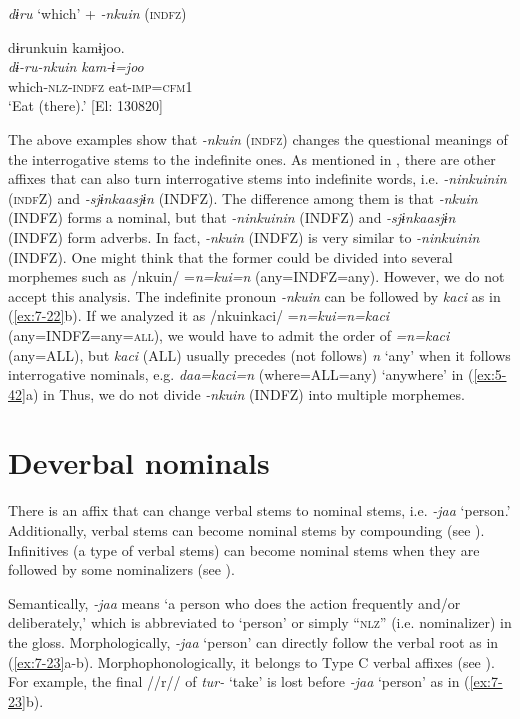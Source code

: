 \ex \label{ex:7:22e} \textit{dɨru} ‘which’ + \textit{{}-nkuin} (\textsc{indfz})

{\TM}
\glll  dɨrunkuin  kamɨjoo.\\
\textit{dɨ-ru-nkuin}  \textit{kam-ɨ=joo}\\
which-\textsc{nlz}-\textsc{indfz}  eat-\textsc{imp}=\textsc{cfm}1\\
\glt ‘Eat  (there).’ [El: 130820]

\z
\z

The above examples show that \textit{{}-nkuin} (\textsc{indfz}) changes the questional meanings of the interrogative stems to the indefinite ones. As mentioned in , there are other affixes that can also turn interrogative stems into indefinite words, i.e. \textit{{}-ninkuinin} (\textsc{indf}Z) and \textit{{}-sjɨnkaasjɨn} (INDFZ). The difference among them is that \textit{{}-nkuin} (INDFZ) forms a nominal, but that \textit{{}-ninkuinin} (INDFZ) and \textit{{}-sjɨnkaasjɨn} (INDFZ) form adverbs. In fact, \textit{{}-nkuin} (INDFZ) is very similar to \textit{{}-ninkuinin} (INDFZ). One might think that the former could be divided into several morphemes such as /nkuin/ =\textit{n=kui=n} (any=INDFZ=any). However, we do not accept this analysis. The indefinite pronoun \textit{{}-nkuin} can be followed by \textit{kaci} as in (\ref{ex:7-22}b). If we analyzed it as /nkuinkaci/ =\textit{n=kui=n=kaci} (any=INDFZ=any=\textsc{all}), we would have to admit the order of \textit{=n=kaci} (any=ALL), but \textit{kaci} (ALL) usually precedes (not follows) \textit{n} ‘any’ when it follows interrogative nominals, e.g. \textit{daa=kaci=n} (where=ALL=any) ‘anywhere’ in (\ref{ex:5-42}a) in  Thus, we do not divide \textit{{}-nkuin} (INDFZ) into multiple morphemes.

\section{Deverbal nominals}

There is an affix that can change verbal stems to nominal stems, i.e. \textit{{}-jaa} ‘person.’ Additionally, verbal stems can become nominal stems by compounding (see ). Infinitives (a type of verbal stems) can become nominal stems when they are followed by some nominalizers (see ).

Semantically, \textit{{}-jaa} means ‘a person who does the action frequently and/or deliberately,’ which is abbreviated to ‘person’ or simply “\textsc{nlz}” (i.e. nominalizer) in the gloss. Morphologically, \textit{-jaa} ‘person’ can directly follow the verbal root as in (\ref{ex:7-23}a-b). Morphophonologically, it belongs to Type C verbal affixes (see ). For example, the final //r// of \textit{tur-} ‘take’ is lost before \textit{{}-jaa} ‘person’ as in (\ref{ex:7-23}b).

